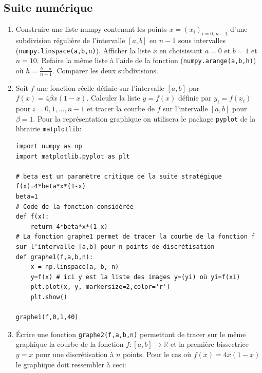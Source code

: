 \documentclass[a4paper]{article}
\begin{document}
\subsection{Suite numérique}
 \begin{enumerate}
 \item  Construire une liste numpy contenant les points $x=(x_i)_{i=0..n-1}$ d'une subdivision régulière de l'intervalle $[a,b]$ en $n-1$ sous intervalles ({\tt numpy.linspace(a,b,n)}). Afficher la liste $x$ en choisissant $a=0$ et $b=1$ et $n=10$. Refaire la même liste à l'aide de la fonction  ({\tt numpy.arange(a,b,h)}) où $h=\frac{b-a}{n-1}$. Comparer les deux subdivisions.
 \item  Soit $f$ une fonction réelle définie sur l'intervalle $[a,b]$ par $f(x)=4\beta x (1-x)$. Calculer la liste $y=f(x)$ définie par $y_i=f(x_i)$ pour $i=0,1,...,n-1$ et tracer la courbe de $f$ sur l'intervalle $[a,b]$ pour $\beta=1$. 
 Pour la représentation graphique on utilisera le  package {\tt pyplot} de la librairie {\tt  matplotlib}:
\begin{lstlisting}
import numpy as np
import matplotlib.pyplot as plt

# beta est un paramètre critique de la suite stratégique f(x)=4*beta*x*(1-x)
beta=1
# Code de la fonction considérée
def f(x):
    return 4*beta*x*(1-x)
# La fonction graphe1 permet de tracer la courbe de la fonction f sur l'intervalle [a,b] pour n points de discrétisation
def graphe1(f,a,b,n):
    x = np.linspace(a, b, n)
    y=f(x) # ici y est la liste des images y=(yi) où yi=f(xi)
    plt.plot(x, y, markersize=2,color='r')
    plt.show()

graphe1(f,0,1,40)
\end{lstlisting}
 \item Écrire une fonction {\tt graphe2(f,a,b,n)} permettant de tracer sur le même graphique la courbe de la fonction $f:[a,b]\to \mathbb{R}$  et  la première bissectrice  $y=x$ pour une discrétisation à $n$ points. Pour le cas où $f(x)=4 x (1-x)$ le graphique doit ressembler à ceci:
 
 \begin{center}
 \end{center}
 

\end{enumerate}
\end{document}
